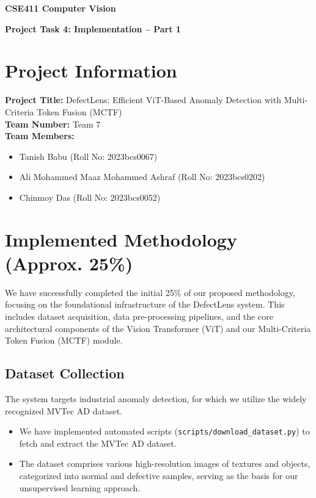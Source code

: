 \documentclass[12pt]{article}
\begin{document}
\begin{center}
    {\LARGE \textbf{CSE411 Computer Vision} \par}
    \vspace{0.2cm}
    {\Large \textbf{Project Task 4: Implementation -- Part 1} \par}
    \vspace{0.5cm}
\end{center}

\section*{Project Information}
\textbf{Project Title:} DefectLens: Efficient ViT-Based Anomaly Detection with Multi-Criteria Token Fusion (MCTF) \\
\textbf{Team Number:} Team 7 \\
\textbf{Team Members:}
\begin{itemize}
    \item Tanish Babu (Roll No: 2023bcs0067)
    \item Ali Mohammed Maaz Mohammed Ashraf (Roll No: 2023bcs0202)
    \item Chinmoy Das (Roll No: 2023bcs0052)
\end{itemize}

\vspace{0.5cm}

\section{Implemented Methodology (Approx. 25\%)}

We have successfully completed the initial 25\% of our proposed methodology, focusing on the foundational infrastructure of the DefectLens system. This includes dataset acquisition, data pre-processing pipelines, and the core architectural components of the Vision Transformer (ViT) and our Multi-Criteria Token Fusion (MCTF) module.

\subsection{Dataset Collection}
The system targets industrial anomaly detection, for which we utilize the widely recognized MVTec AD dataset. 
\begin{itemize}
    \item We have implemented automated scripts (\texttt{scripts/download\_dataset.py}) to fetch and extract the MVTec AD dataset.
    \item The dataset comprises various high-resolution images of textures and objects, categorized into normal and defective samples, serving as the basis for our unsupervised learning approach.
\end{itemize}
\end{document}
